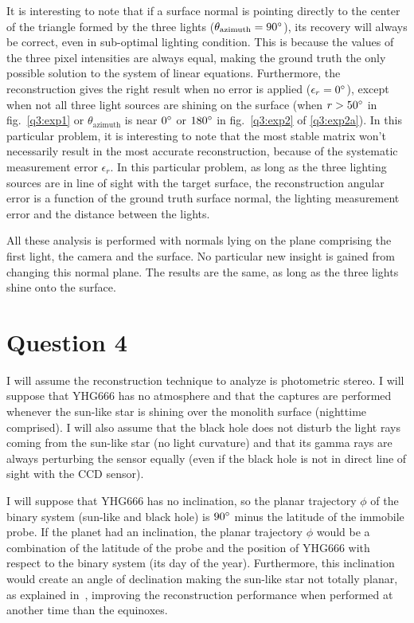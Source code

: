 \documentclass{report}
\begin{document}
It is interesting to note that if a surface normal is pointing directly to the center of the triangle formed by the three lights ($\theta_{\text{azimuth}} = 90\degree$), its recovery will always be correct, even in sub-optimal lighting condition. This is because the values of the three pixel intensities are always equal, making the ground truth the only possible solution to the system of linear equations. Furthermore, the reconstruction gives the right result when no error is applied ($\epsilon_r = 0\degree$), except when not all three light sources are shining on the surface (when $r > 50\degree$ in fig.~\ref{q3:exp1} or $\theta_{\text{azimuth}}$ is near $0\degree$ or $180\degree$ in fig.~\ref{q3:exp2} of \ref{q3:exp2a}). In this particular problem, it is interesting to note that the most stable matrix won't necessarily result in the most accurate reconstruction, because of the systematic measurement error $\epsilon_r$. In this particular problem, as long as the three lighting sources are in line of sight with the target surface, the reconstruction angular error is a function of the ground truth surface normal, the lighting measurement error and the distance between the lights.

All these analysis is performed with normals lying on the plane comprising the first light, the camera and the surface. No particular new insight is gained from changing this normal plane. The results are the same, as long as the three lights shine onto the surface.

\FloatBarrier
\section{Question 4}

I will assume the reconstruction technique to analyze is photometric stereo. I will suppose that YHG666 has no atmosphere and that the captures are performed whenever the sun-like star is shining over the monolith surface (nighttime comprised). I will also assume that the black hole does not disturb the light rays coming from the sun-like star (no light curvature) and that its gamma rays are always perturbing the sensor equally (even if the black hole is not in direct line of sight with the CCD sensor).

I will suppose that YHG666 has no inclination, so the planar trajectory $\phi$ of the binary system (sun-like and black hole) is $90\degree$ minus the latitude of the immobile probe. If the planet had an inclination, the planar trajectory $\phi$ would be a combination of the latitude of the probe and the position of YHG666 with respect to the binary system (its day of the year). Furthermore, this inclination would create an angle of declination making the sun-like star not totally planar, as explained in~\cite{shen-pg-14}, improving the reconstruction performance when performed at another time than the equinoxes.
\end{document}

